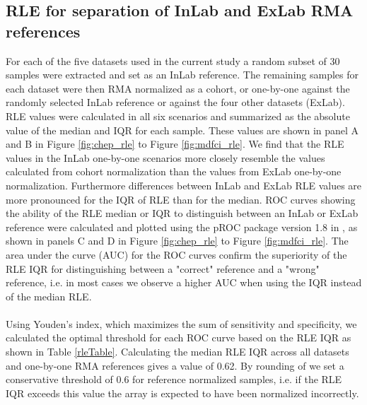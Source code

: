 \subsection{RLE for separation of InLab and ExLab RMA references} \label{rle_sepa}
For each of the five datasets used in the current study a random subset of 30 samples were extracted and set as an InLab reference. The remaining samples for each dataset were then RMA normalized as a cohort, or one-by-one against the randomly selected InLab reference or against the four other datasets (ExLab). RLE values were calculated in all six scenarios and summarized as the absolute value of the median and IQR for each sample. These values are shown in panel A and B in Figure \ref{fig:chep_rle} to Figure \ref{fig:mdfci_rle}. We find that the RLE values in the InLab one-by-one scenarios more closely resemble the values calculated from cohort normalization than the values from ExLab one-by-one normalization. Furthermore differences between InLab and ExLab RLE values are more pronounced for the IQR of RLE than for the median. ROC curves showing the ability of the RLE median or IQR to distinguish between an InLab or ExLab reference were calculated and plotted using the pROC package version 1.8 \citep{Robin2011} in \R, as shown in panels C and D in Figure \ref{fig:chep_rle} to Figure \ref{fig:mdfci_rle}. The area under the curve (AUC) for the ROC curves confirm the superiority of the RLE IQR for distinguishing between a "correct" reference and a "wrong" reference, i.e. in most cases we observe a higher AUC when using the IQR instead of the median RLE.\\\\
Using Youden's index, which maximizes the sum of sensitivity and specificity, we calculated the optimal threshold for each ROC curve based on the RLE IQR as shown in Table \ref{rleTable}. Calculating the median RLE IQR across all datasets and one-by-one RMA references gives a value of 0.62. By rounding of we set a conservative threshold of 0.6 for reference normalized samples, i.e. if the RLE IQR exceeds this value the array is expected to have been normalized incorrectly.

